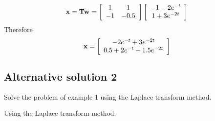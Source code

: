 \[
{\bf{x}} = {\bf{Tw}} = \left[ {\begin{array}{*{20}c}
   1 & 1  \\
   { - 1} & { - 0.5}  \\
\end{array}} \right]\left[ {\begin{array}{*{20}c}
   { - 1 - 2e^{ - t} }  \\
   {1 + 3e^{ - 2t} }  \\
\end{array}} \right]
\]
Therefore
\[
{\bf{x}} = \left[ {\begin{array}{*{20}c}
   { - 2e^{ - t}  + 3e^{ - 2t} }  \\
   {0.5 + 2e^{ - t}  - 1.5e^{ - 2t} }  \\
\end{array}} \right]
\]



\subsection*{Alternative solution 2}
 \ifslidesonly
 \begin{slide}
 Solve the problem of example 1 using the Laplace transform method.
 \end{slide}
 \fi
Using the Laplace transform method.

